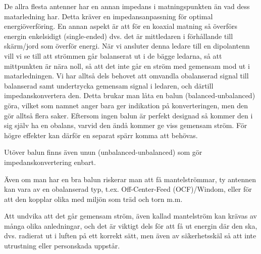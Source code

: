De allra flesta antenner har en annan impedans i matningspunkten än vad dess
matarledning har. Detta kräver en impedansanpassning för optimal
energiöverföring. En annan aspekt är att för en koaxial matning så överförs
energin enkelsidigt (single-ended) dvs. det är mittledaren i förhållande till
skärm/jord som överför energi. När vi ansluter denna ledare till en dipolantenn
vill vi se till att strömmen går balanserat ut i de bägge ledarna,
så att mittpunkten är nära noll, så att det inte går en ström med gemensam
mod ut i matarledningen. Vi har alltså dels behovet att omvandla obalanserad
signal till balanserad samt undertrycka gemensam signal i ledaren, och därtill
impedanskonvertera den. Detta brukar man låta en balun (balanced-unbalanced)
göra, vilket som namnet anger bara ger indikation på konverteringen, men den
gör alltså flera saker. Eftersom ingen balun är perfekt designad så kommer
den i sig själv ha en obalans, varvid den ändå kommer ge viss gemensam ström.
För högre effekter kan därför en separat spärr komma att behövas.

Utöver balun finns även unun (unbalanced-unbalanced) som gör
impedanskonvertering enbart.

Även om man har en bra balun riskerar man att få mantelströmmar, ty antennen
kan vara av en obalanserad typ, t.ex. Off-Center-Feed (OCF)/Windom, eller
för att den kopplar olika med miljön som träd och torn m.m.

Att undvika att det går gemensam ström, även kallad mantelström kan krävas av
många olika anledningar, och det är viktigt dels för att få ut energin där den
ska, dvs. radierat ut i luften på ett korrekt sätt, men även av säkerhetsskäl
så att inte utrustning eller personskada uppstår.

